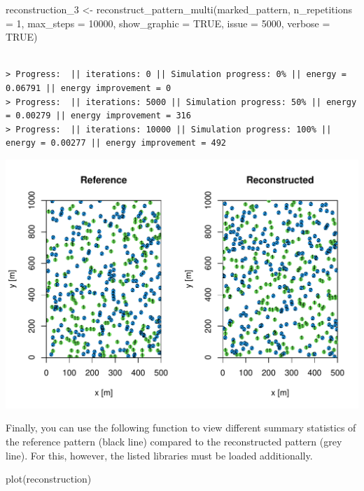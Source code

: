 \documentclass[
  letterpaper,
  DIV=11,
  numbers=noendperiod]{scrreprt}
\newenvironment{Shaded}{\begin{snugshade}}{\end{snugshade}}
\newcommand{\AttributeTok}[1]{\textcolor[rgb]{0.40,0.45,0.13}{#1}}
\newcommand{\ConstantTok}[1]{\textcolor[rgb]{0.56,0.35,0.01}{#1}}
\newcommand{\DecValTok}[1]{\textcolor[rgb]{0.68,0.00,0.00}{#1}}
\newcommand{\FunctionTok}[1]{\textcolor[rgb]{0.28,0.35,0.67}{#1}}
\newcommand{\NormalTok}[1]{\textcolor[rgb]{0.00,0.23,0.31}{#1}}
\newcommand{\OtherTok}[1]{\textcolor[rgb]{0.00,0.23,0.31}{#1}}
\begin{document}
\begin{Shaded}
\begin{Highlighting}[]
\NormalTok{reconstruction\_3 }\OtherTok{\textless{}{-}} \FunctionTok{reconstruct\_pattern\_multi}\NormalTok{(marked\_pattern, }\AttributeTok{n\_repetitions =} \DecValTok{1}\NormalTok{, }\AttributeTok{max\_steps =} \DecValTok{10000}\NormalTok{, }\AttributeTok{show\_graphic =} \ConstantTok{TRUE}\NormalTok{, }\AttributeTok{issue =} \DecValTok{5000}\NormalTok{, }\AttributeTok{verbose =} \ConstantTok{TRUE}\NormalTok{) }
\end{Highlighting}
\end{Shaded}

\begin{verbatim}

> Progress:  || iterations: 0 || Simulation progress: 0% || energy = 0.06791 || energy improvement = 0
> Progress:  || iterations: 5000 || Simulation progress: 50% || energy = 0.00279 || energy improvement = 316
> Progress:  || iterations: 10000 || Simulation progress: 100% || energy = 0.00277 || energy improvement = 492
\end{verbatim}

\includegraphics{simple_application_example_files/figure-pdf/unnamed-chunk-5-1.pdf}

Finally, you can use the following function to view different summary
statistics of the reference pattern (black line) compared to the
reconstructed pattern (grey line). For this, however, the listed
libraries must be loaded additionally.

\begin{Shaded}
\begin{Highlighting}[]
\FunctionTok{plot}\NormalTok{(reconstruction)}
\end{Highlighting}
\end{Shaded}
\end{document}
